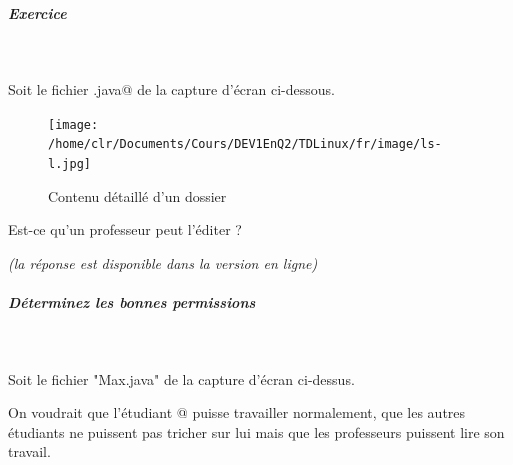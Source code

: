 \documentclass[11pt,a4paper]{article}
\begin{document}
			
		\subparagraph{Exercice } 
		
					\textcolor{white}{.} \par
				
            \par
          
					Soit le fichier \verb@Max.java@ de la capture d'\'ecran ci-dessous.  
				
            \par
        \begin{figure}[hbt]
				    \begin{center}
					\texttt{[image: /home/clr/Documents/Cours/DEV1EnQ2/TDLinux/fr/image/ls-l.jpg]}
						\end{center}
                
                    \caption[Contenu d\'etaill\'e d'un dossier]{Contenu d\'etaill\'e d'un dossier}
                \end{figure}
                    
					Est-ce qu'un professeur peut l'\'editer ? 
				
            \par
         {\footnotesize\emph{(la r\'eponse est disponible dans la version en ligne)}\par} 
			
		\subparagraph{D\'eterminez les bonnes permissions} 
		
                \textcolor{white}{.} \par
            
							Soit le fichier "Max.java" de la capture d'\'ecran ci-dessus.
							
							On voudrait que l'\'etudiant @ puisse travailler  
							normalement, que les autres \'etudiants ne puissent pas tricher sur  
							lui mais que les professeurs puissent lire son travail.   
						
\end{document}
